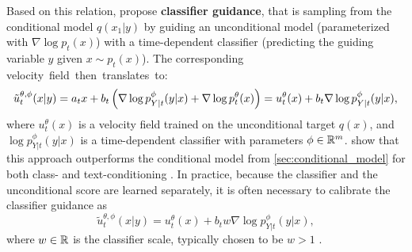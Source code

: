 \documentclass{fairmeta}
\newcommand{\highlight}[1]{{\color{metablue} \textbf{#1}}}
\numberwithin{equation}{section}
\begin{document}
Based on this relation, \citet{song2021sde} propose \highlight{classifier guidance}, that is sampling from the conditional model $q(x_1|y)$ by guiding an unconditional model (parameterized with $\nabla\log p_t(x)$) with a time-dependent classifier (predicting the guiding variable $y$ given $x\sim p_t(x)$).
The corresponding \mbox{velocity field then translates to:}
\begin{equation}\label{e:ut_classifier_guidance}
    \tilde{u}_t^{\theta,\phi}(x|y) = a_t x + b_t \left (\nabla \log p_{Y|t}^\phi(y|x) + \nabla \log p_t^\theta (x)\right ) = u_t^\theta(x) + b_t \nabla \log p_{Y|t}^\phi(y|x),
\end{equation}
where $u_t^\theta(x)$ is a velocity field trained on the unconditional target $q(x)$, and $\log p_{Y|t}^\phi(y|x)$ is a time-dependent classifier with parameters $\phi\in\mathbb R^{m}$.
\cite{dhariwal2021beat} show that this approach outperforms the conditional model from \cref{sec:conditional_model} for both class- and text-conditioning \citep{nichol2022glide}.
In practice, because the classifier and the unconditional score are learned separately, it is often necessary to calibrate the classifier guidance as 
\begin{equation}\label{e:ut_classifier_guidance_calibrated}
    \tilde{u}_t^{\theta,\phi}(x|y) = u_t^\theta(x) + b_t w\nabla \log p_{Y|t}^\phi(y|x),
\end{equation}
where $w\in \mathbb R$ is the classifier scale, typically chosen to be $w>1$ \citep{dhariwal2021beat}.
\end{document}
